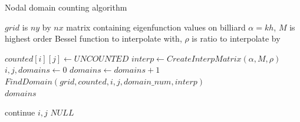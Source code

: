\documentclass{report}
\begin{document}
\begin{algorithm}
  \caption{Nodal domain counting algorithm}
  \begin{algorithmic}
    \Require $grid$ is $ny$ by $nx$ matrix containing eigenfunction values on billiard
    \Require $\alpha = k h$, $M$ is highest order Bessel function to interpolate with, $\rho$ is ratio to interpolate by

    \item[]
                \State $counted[i][j] \gets UNCOUNTED$
            \EndFor
        \EndFor
        \State $interp \gets CreateInterpMatrix(\alpha, M, \rho)$
        \State $i,j,domains \gets 0$
            \State $domains \gets domains + 1$
            \State $FindDomain(grid, counted, i, j, domain\_num, interp)$
        \EndWhile \\
        \Return $domains$
    \EndFunction

    \item[]
                    \State continue
                \EndIf
                    \State \Return $i,j$
                \EndIf
            \EndFor
        \EndFor
        \State \Return $NULL$
    \EndFunction
  \end{algorithmic}
\end{algorithm}
\end{document}
